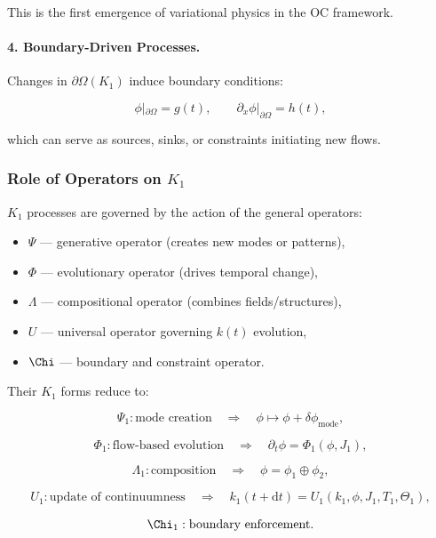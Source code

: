 This is the first emergence of variational physics in the OC framework.

\paragraph{4. Boundary-Driven Processes.}

Changes in $\partial\Omega(K_1)$ induce boundary conditions:

\[
\phi|_{\partial\Omega} = g(t),
\qquad
\partial_x\phi|_{\partial\Omega} = h(t),
\]

which can serve as sources, sinks, or constraints initiating new flows.

\subsubsection{Role of Operators on \texorpdfstring{$K_1$}{K_1}}

$K_1$ processes are governed by the action of the general operators:

\begin{itemize}
    \item $\Psi$ — generative operator (creates new modes or patterns),
    \item $\Phi$ — evolutionary operator (drives temporal change),
    \item $\Lambda$ — compositional operator (combines fields/structures),
    \item $U$ — universal operator governing $k(t)$ evolution,
    \item $\Chi$ — boundary and constraint operator.
\end{itemize}

Their $K_1$ forms reduce to:

\[
\Psi_1: \text{mode creation}
\quad\Rightarrow\quad
\phi \mapsto \phi + \delta\phi_{\text{mode}},
\]

\[
\Phi_1: \text{flow-based evolution}
\quad\Rightarrow\quad
\partial_t \phi = \Phi_1(\phi,J_1),
\]

\[
\Lambda_1: \text{composition}
\quad\Rightarrow\quad
\phi = \phi_1 \oplus \phi_2,
\]

\[
U_1: \text{update of continuumness}
\quad\Rightarrow\quad
k_1(t+\mathrm{d}t) = U_1(k_1,\phi,J_1,T_1,\Theta_1),
\]

\[
\Chi_1: \text{boundary enforcement}.
\]

